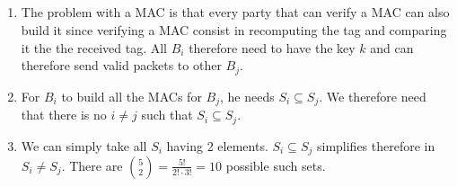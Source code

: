 \subsection{}
\begin{solution}
  \begin{enumerate}
    \item
      The problem with a MAC is that every party that can verify a MAC can also build it since verifying a MAC consist
      in recomputing the tag and comparing it the the received tag.
      All $B_i$ therefore need to have the key $k$ and can therefore send valid packets to other $B_j$.
    \item
      For $B_i$ to build all the MACs for $B_j$, he needs $S_i \subseteq S_j$.
      We therefore need that there is no $i \neq j$ such that $S_i \subseteq S_j$.
    \item We can simply take all $S_i$ having 2 elements.
      $S_i \subseteq S_j$ simplifies therefore in $S_i \neq S_j$.
      There are ${5 \choose 2} = \frac{5!}{2! \cdot 3!} = 10$ possible such sets.
  \end{enumerate}
\end{solution}
